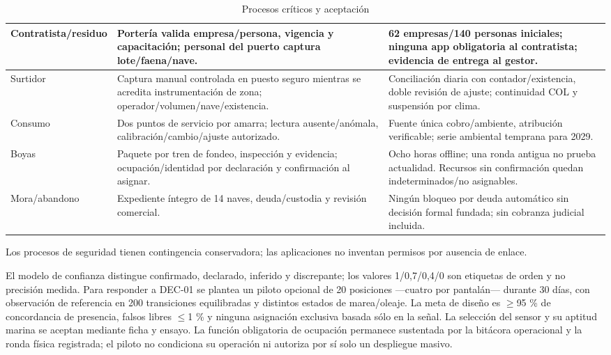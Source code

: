 \documentclass[11pt,letterpaper]{report}
\begin{document}
\begin{table}[H]
\begin{tabularx}{\linewidth}{|p{.19\linewidth}|p{.35\linewidth}|X|}
Contratista/residuo & Portería valida empresa/persona, vigencia y capacitación; personal del puerto captura lote/faena/nave. & 62 empresas/140 personas iniciales; ninguna app obligatoria al contratista; evidencia de entrega al gestor. \\ \hline
Surtidor & Captura manual controlada en puesto seguro mientras se acredita instrumentación de zona; operador/volumen/nave/existencia. & Conciliación diaria con contador/existencia, doble revisión de ajuste; continuidad COL y suspensión por clima. \\ \hline
Consumo & Dos puntos de servicio por amarra; lectura ausente/anómala, calibración/cambio/ajuste autorizado. & Fuente única cobro/ambiente, atribución verificable; serie ambiental temprana para 2029. \\ \hline
Boyas & Paquete por tren de fondeo, inspección y evidencia; ocupación/identidad por declaración y confirmación al asignar. & Ocho horas offline; una ronda antigua no prueba actualidad. Recursos sin confirmación quedan indeterminados/no asignables. \\ \hline
Mora/abandono & Expediente íntegro de 14 naves, deuda/custodia y revisión comercial. & Ningún bloqueo por deuda automático sin decisión formal fundada; sin cobranza judicial incluida. \\ \hline
\end{tabularx}
\caption{Procesos críticos y aceptación}
\label{tab:procesos-criticos}
\end{table}
Los procesos de seguridad tienen contingencia conservadora; las aplicaciones no inventan permisos por ausencia de enlace.

El modelo de confianza distingue confirmado, declarado, inferido y discrepante; los valores 1/0,7/0,4/0 son etiquetas de orden y no precisión medida. Para responder a DEC-01 se plantea un piloto opcional de 20 posiciones ---cuatro por pantalán--- durante 30 días, con observación de referencia en 200 transiciones equilibradas y distintos estados de marea/oleaje. La meta de diseño es $\geq$95 \% de concordancia de presencia, falsos libres $\leq$1 \% y ninguna asignación exclusiva basada sólo en la señal. La selección del sensor y su aptitud marina se aceptan mediante ficha y ensayo. La función obligatoria de ocupación permanece sustentada por la bitácora operacional y la ronda física registrada; el piloto no condiciona su operación ni autoriza por sí solo un despliegue masivo.
\end{document}
